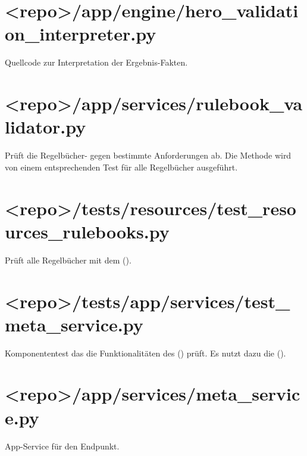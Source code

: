 \begin{landscape}
    \section{<repo>/app/engine/hero\_validation\_interpreter.py}\label{sec:hero-validation-interpreter.py}
    Quellcode zur Interpretation der Ergebnis-Fakten.
    \vspace{-1em}

    \section{<repo>/app/services/rulebook\_validator.py}\label{sec:rulebook-validator.py}
    Prüft die Regelbücher- gegen bestimmte Anforderungen ab.
    Die  Methode wird von einem entsprechenden Test für alle Regelbücher ausgeführt.
    \vspace{-1em}

    \section{<repo>/tests/resources/test\_resources\_rulebooks.py}\label{sec:test-resources-rulebooks.py}
    Prüft alle  Regelbücher mit dem  ().
    \vspace{-1em}

    \section{<repo>/tests/app/services/test\_meta\_service.py}\label{sec:test-meta-service.py}
    Komponententest das die Funktionalitäten des  () prüft.
    Es nutzt dazu die  ().
    \vspace{-1em}

    \section{<repo>/app/services/meta\_service.py}\label{sec:meta-service.py}
    App-Service für den  Endpunkt.
    \vspace{-1em}


\end{landscape}
